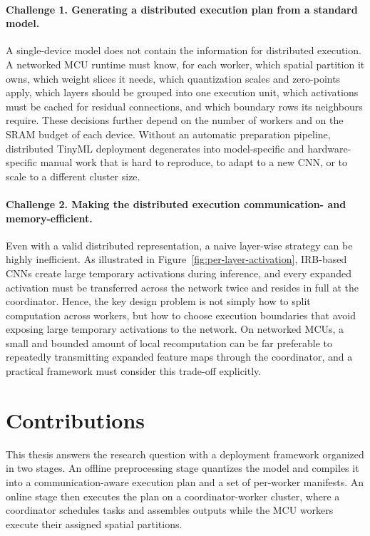\paragraph{Challenge 1. Generating a distributed execution plan from a standard model.}
A single-device model does not contain the information for distributed execution. A networked MCU runtime must know, for each worker, which spatial partition it owns, which weight slices it needs, which quantization scales and zero-points apply, which layers should be grouped into one execution unit, which activations must be cached for residual connections, and which boundary rows its neighbours require. These decisions further depend on the number of workers and on the SRAM budget of each device. Without an automatic preparation pipeline, distributed TinyML deployment degenerates into model-specific and hardware-specific manual work that is hard to reproduce, to adapt to a new CNN, or to scale to a different cluster size.

\paragraph{Challenge 2. Making the distributed execution communication- and memory-efficient.}
Even with a valid distributed representation, a naive layer-wise strategy can be highly inefficient. As illustrated in Figure~\ref{fig:per-layer-activation}, IRB-based CNNs create large temporary activations during inference, and every expanded activation must be transferred across the network twice and resides in full at the coordinator. Hence, the key design problem is not simply how to split computation across workers, but how to choose execution boundaries that avoid exposing large temporary activations to the network. On networked MCUs, a small and bounded amount of local recomputation can be far preferable to repeatedly transmitting expanded feature maps through the coordinator, and a practical framework must consider this trade-off explicitly.

\section{Contributions}
\label{sec:intro-contributions}
This thesis answers the research question with a deployment framework organized in two stages. 
An offline preprocessing stage quantizes the model and compiles it into a communication-aware execution plan and a set of per-worker manifests. 
An online stage then executes the plan on a coordinator-worker cluster, where a coordinator schedules tasks and assembles outputs while the MCU workers execute their assigned spatial partitions. 

